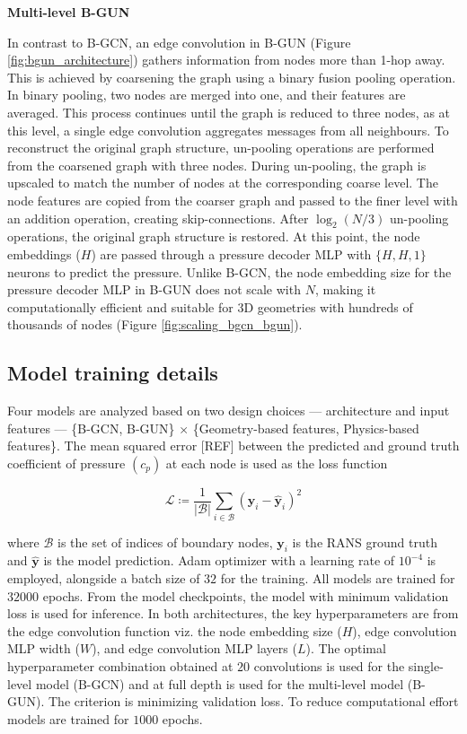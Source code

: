 \documentclass{marine_2025_paper_template}
\begin{document}
\newpage
\noindent \textbf{Multi-level B-GUN}
    
In contrast to B-GCN, an edge convolution in B-GUN (Figure \ref{fig:bgun_architecture}) gathers information from nodes more than 1-hop away. This is achieved by coarsening the graph using a binary fusion pooling operation. In binary pooling, two nodes are merged into one, and their features are averaged. This process continues until the graph is reduced to three nodes, as at this level, a single edge convolution aggregates messages from all neighbours. To reconstruct the original graph structure, un-pooling operations are performed from the coarsened graph with three nodes. During un-pooling, the graph is upscaled to match the number of nodes at the corresponding coarse level. The node features are copied from the coarser graph and passed to the finer level with an addition operation, creating skip-connections. After $\log_2(N/3)$ un-pooling operations, the original graph structure is restored. At this point, the node embeddings ($H$) are passed through a pressure decoder MLP with $\{ H, H, 1 \}$ neurons to predict the pressure. Unlike B-GCN, the node embedding size for the pressure decoder MLP in B-GUN does not scale with $N$, making it computationally efficient and suitable for 3D geometries with hundreds of thousands of nodes (Figure \ref{fig:scaling_bgcn_bgun}).

\subsection{Model training details}

Four models are analyzed based on two design choices --- architecture and input features --- \{B-GCN, B-GUN\} $\times$ \{Geometry-based features, Physics-based features\}. The mean squared error [REF] between the predicted and ground truth coefficient of pressure $(c_p)$ at each node is used as the loss function

\begin{equation}
    \mathcal{L} \coloneqq \frac{1}{|\mathcal{B}|} \sum_{i \in \mathcal{B}} {(\mathbf{y}_i - \hat{\mathbf{y}}_i)^2}
\end{equation}

\noindent
where $\mathcal{B}$ is the set of indices of boundary nodes, $\mathbf{y}_i$ is the RANS ground truth and $\hat{\mathbf{y}}$ is the model prediction. Adam optimizer with a learning rate of $10^{-4}$ is employed, alongside a batch size of $32$ for the training. All models are trained for $32000$ epochs. From the model checkpoints, the model with minimum validation loss is used for inference. In both architectures, the key hyperparameters are from the edge convolution function viz. the node embedding size ($H$), edge convolution MLP width ($W$), and edge convolution MLP layers ($L$). The optimal hyperparameter combination obtained at $20$ convolutions is used for the single-level model (B-GCN) and at full depth is used for the multi-level model (B-GUN). The criterion is minimizing validation loss. To reduce computational effort models are trained for $1000$ epochs. \newline
\end{document}
